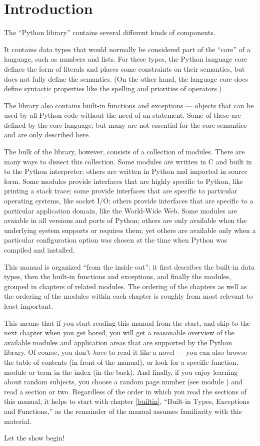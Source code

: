 \chapter{Introduction}
\label{intro}

The ``Python library'' contains several different kinds of components.

It contains data types that would normally be considered part of the
``core'' of a language, such as numbers and lists.  For these types,
the Python language core defines the form of literals and places some
constraints on their semantics, but does not fully define the
semantics.  (On the other hand, the language core does define
syntactic properties like the spelling and priorities of operators.)

The library also contains built-in functions and exceptions ---
objects that can be used by all Python code without the need of an
 statement.  Some of these are defined by the core
language, but many are not essential for the core semantics and are
only described here.

The bulk of the library, however, consists of a collection of modules.
There are many ways to dissect this collection.  Some modules are
written in C and built in to the Python interpreter; others are
written in Python and imported in source form.  Some modules provide
interfaces that are highly specific to Python, like printing a stack
trace; some provide interfaces that are specific to particular
operating systems, like socket I/O; others provide interfaces that are
specific to a particular application domain, like the World-Wide Web.
Some modules are avaiable in all versions and ports of Python; others
are only available when the underlying system supports or requires
them; yet others are available only when a particular configuration
option was chosen at the time when Python was compiled and installed.

This manual is organized ``from the inside out'': it first describes
the built-in data types, then the built-in functions and exceptions,
and finally the modules, grouped in chapters of related modules.  The
ordering of the chapters as well as the ordering of the modules within
each chapter is roughly from most relevant to least important.

This means that if you start reading this manual from the start, and
skip to the next chapter when you get bored, you will get a reasonable
overview of the available modules and application areas that are
supported by the Python library.  Of course, you don't \emph{have} to
read it like a novel --- you can also browse the table of contents (in
front of the manual), or look for a specific function, module or term
in the index (in the back).  And finally, if you enjoy learning about
random subjects, you choose a random page number (see module
) and read a section or two.  Regardless of the
order in which you read the sections of this manual, it helps to start 
with chapter \ref{builtin}, ``Built-in Types, Exceptions and
Functions,'' as the remainder of the manual assumes familiarity with
this material.

Let the show begin!
